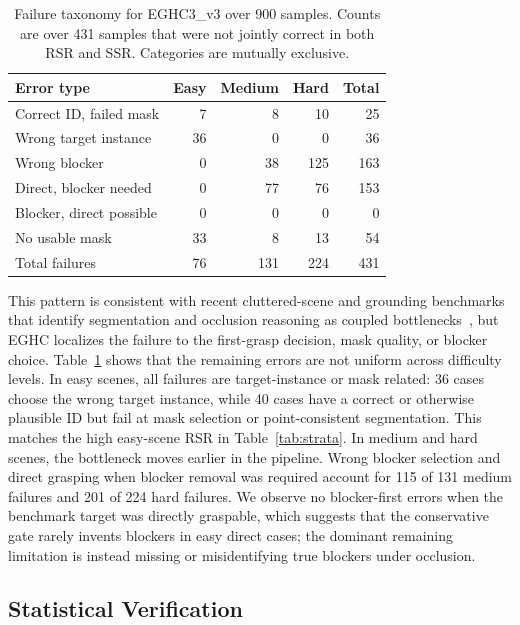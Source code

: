 \begin{table}[t]
\centering
\caption{Failure taxonomy for EGHC3\_v3 over 900 samples. Counts are over 431 samples that were not jointly correct in both RSR and SSR. Categories are mutually exclusive.}
\label{tab:failure_taxonomy}
\small
\begin{tabular}{lrrrr}
\toprule
Error type & Easy & Medium & Hard & Total \\
\midrule
Correct ID, failed mask & 7 & 8 & 10 & 25 \\
Wrong target instance & 36 & 0 & 0 & 36 \\
Wrong blocker & 0 & 38 & 125 & 163 \\
Direct, blocker needed & 0 & 77 & 76 & 153 \\
Blocker, direct possible & 0 & 0 & 0 & 0 \\
No usable mask & 33 & 8 & 13 & 54 \\
\midrule
Total failures & 76 & 131 & 224 & 431 \\
\bottomrule
\end{tabular}
\end{table}

This pattern is consistent with recent cluttered-scene and grounding benchmarks that identify segmentation and occlusion reasoning as coupled bottlenecks~\cite{graspclutter6d,realvlgr1}, but EGHC localizes the failure to the first-grasp decision, mask quality, or blocker choice. Table~\ref{tab:failure_taxonomy} shows that the remaining errors are not uniform across difficulty levels. In easy scenes, all failures are target-instance or mask related: 36 cases choose the wrong target instance, while 40 cases have a correct or otherwise plausible ID but fail at mask selection or point-consistent segmentation. This matches the high easy-scene RSR in Table~\ref{tab:strata}. In medium and hard scenes, the bottleneck moves earlier in the pipeline. Wrong blocker selection and direct grasping when blocker removal was required account for 115 of 131 medium failures and 201 of 224 hard failures. We observe no blocker-first errors when the benchmark target was directly graspable, which suggests that the conservative gate rarely invents blockers in easy direct cases; the dominant remaining limitation is instead missing or misidentifying true blockers under occlusion.

\subsection{Statistical Verification}

